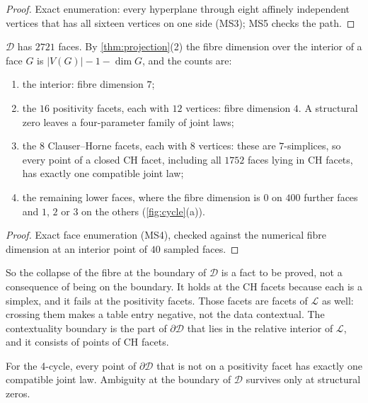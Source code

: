 \documentclass[11pt]{article}
\theoremstyle{definition}\newtheorem{definition}[theorem]{Definition}\newtheorem{remark}[theorem]{Remark}\newtheorem{example}[theorem]{Example}\newtheorem{problem}[theorem]{Open problem}\crefname{problem}{Problem}{Problems}
\begin{document}
\begin{proof}
Exact enumeration: every hyperplane through eight affinely independent vertices that has all sixteen vertices on one side (MS3); MS5 checks the path.
\end{proof}

\begin{proposition}\label{prop:cyclefibres}
$\mathcal D$ has $2721$ faces. By \cref{thm:projection}(2) the fibre dimension over the interior of a face $G$ is $|V(G)|-1-\dim G$, and the counts are:
\begin{enumerate}
\item[(1)] the interior: fibre dimension $7$;
\item[(2)] the $16$ positivity facets, each with $12$ vertices: fibre dimension $4$. A structural zero leaves a four-parameter family of joint laws;
\item[(3)] the $8$ Clauser--Horne facets, each with $8$ vertices: these are $7$-simplices, so every point of a closed CH facet, including all $1752$ faces lying in CH facets, has exactly one compatible joint law;
\item[(4)] the remaining lower faces, where the fibre dimension is $0$ on $400$ further faces and $1$, $2$ or $3$ on the others (\cref{fig:cycle}(a)).
\end{enumerate}
\end{proposition}

\begin{proof}
Exact face enumeration (MS4), checked against the numerical fibre dimension at an interior point of $40$ sampled faces.
\end{proof}

So the collapse of the fibre at the boundary of $\mathcal D$ is a fact to be proved, not a consequence of being on the boundary. It holds at the CH facets because each is a simplex, and it fails at the positivity facets. Those facets are facets of $\mathcal L$ as well: crossing them makes a table entry negative, not the data contextual. The contextuality boundary is the part of $\partial\mathcal D$ that lies in the relative interior of $\mathcal L$, and it consists of points of CH facets.

\begin{corollary}\label{cor:rigid}
For the 4-cycle, every point of $\partial\mathcal D$ that is not on a positivity facet has exactly one compatible joint law. Ambiguity at the boundary of $\mathcal D$ survives only at structural zeros.
\end{corollary}
\end{document}
